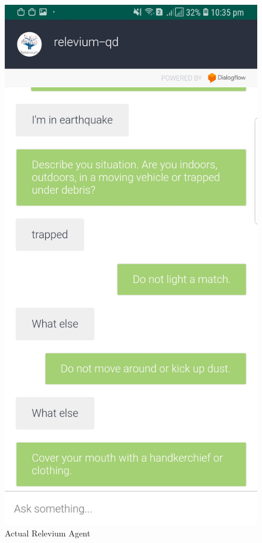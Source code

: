\documentclass{scrreprt}
\begin{document}
\begin{figure}[ht!]
    \includegraphics[height=0.6\textheight]{AppDesign/actualDesign/AgentResponse.jpg}
    \caption[Actual Relevium Home Agent]{Actual Relevium Agent}%
    \label{fig:Actual_Draft2}%
  \end{figure}
  
\end{document}

